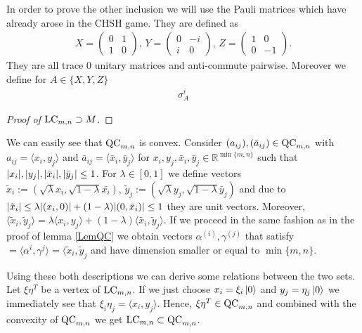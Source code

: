 In order to prove the other inclusion we will use the Pauli matrices which have already arose in the CHSH game. They are defined as 
\begin{align*}
	X = \begin{pmatrix}
	0 & 1 \\ 1 & 0
	\end{pmatrix}, \, Y = \begin{pmatrix}
	0 & -i \\ i & 0
	\end{pmatrix}, \, Z = \begin{pmatrix}
	1 & 0 \\ 0 & -1
	\end{pmatrix}.
\end{align*}
They are all trace $ 0 $ unitary matrices and anti-commute pairwise. 
Moreover we define for $ A \in \{ X,Y,Z \}$
\begin{align*}
	\sigma_A^i
\end{align*}
\begin{proof}[Proof of $ \textup{LC}_{m,n} \supset M $]
	
\end{proof}
We can easily see that $ \textup{QC}_{m,n} $ is convex. Consider $ (a_{ij}), (\bar{a}_{ij}) \in \textup{QC}_{m,n} $ with $ a_{ij} = \langle x_i, y_j \rangle $ and $ \bar{a}_{ij} = \langle \bar{x}_i, \bar{y}_j \rangle $ for $ x_{i},y_j, \bar{x}_i,\bar{y}_j \in \mathbb{R}^{\min \{m,n\}} $ such that $ {\left|{x_i}\right|},{\left|{y_j}\right|}, {\left|{\bar{x}_i}\right|}, {\left|{\bar{y}_j}\right|} \le 1 $.
For $ \lambda \in [0,1] $ we define vectors $\tilde{x}_i:= (\sqrt{\lambda}x_i,\sqrt{1-\lambda}\bar{x_i}), \, \tilde{y}_j:= (\sqrt{\lambda}y_j, \sqrt{1-\lambda}\bar{y}_j) $ and due to  $ {\left|{\tilde{x}_i}\right|} \le \lambda {\left|{(x_i,0)}\right|} + (1-\lambda){\left|{(0,\bar{x}_i)}\right|} \le 1 $ they are unit vectors. Moreover, $ \langle \tilde{x}_i, \tilde{y}_j \rangle = \lambda \langle x_i,y_j \rangle + (1-\lambda) \langle \tilde{x_i},\tilde{y}_j \rangle$. If we proceed in the same fashion as in the proof of lemma \ref{LemQC} we obtain vectors 
$ \alpha^{(i)},\gamma^{(j)} $ that satisfy $= \langle \alpha^{i},\gamma^{j} \rangle = \langle \tilde{x} _i, \tilde{y}_j$ and have dimension smaller or equal to $ \min \{m,n\} $.

Using these both descriptions we can derive some relations between the two sets. 
Let $ \xi\eta^T $ be a vertex of $ \textup{LC}_{m,n} $. If we just choose $ x_i = \xi_i \ket{0}$ and $ y_j = \eta_j\ket{0} $ we immediately see that $ \xi_i\eta_j = \langle x_i, y_j \rangle $. Hence, $ \xi\eta^T \in \textup{QC}_{m,n} $ and combined with the convexity of $ \textup{QC}_{m,n} $ we get $ \textup{LC}_{m,n} \subset \textup{QC}_{m,n} $.

